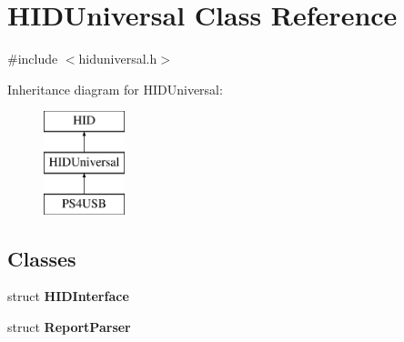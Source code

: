 \hypertarget{class_h_i_d_universal}{\section{\-H\-I\-D\-Universal \-Class \-Reference}
\label{class_h_i_d_universal}
}


{\ttfamily \#include $<$hiduniversal.\-h$>$}

\-Inheritance diagram for \-H\-I\-D\-Universal\-:\begin{figure}[H]
\begin{center}
\leavevmode
\includegraphics[height=3.000000cm]{class_h_i_d_universal}
\end{center}
\end{figure}
\subsection*{\-Classes}
\begin{DoxyCompactItemize}
\item 
struct {\bfseries \-H\-I\-D\-Interface}
\item 
struct {\bfseries \-Report\-Parser}
\end{DoxyCompactItemize}
